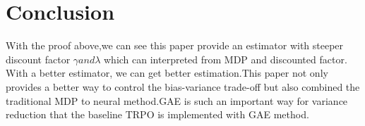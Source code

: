 \section{Conclusion}
\label{section:conclusion}
With the proof above,we can see this paper provide an estimator with steeper discount factor ${\gamma} and {\lambda}$ which can interpreted from MDP and discounted factor. With a better estimator, we can get better estimation.This paper not only provides a better way to control the bias-variance trade-off but also combined the traditional MDP to neural method.GAE is such an important way for variance reduction that the baseline TRPO is implemented with GAE method.